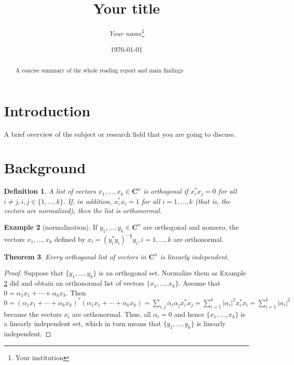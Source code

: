 \documentclass[12pt]{article}
\title{Your title}
\author{\textit{Your name}\footnote{Your institution}}
\date{\today}
\newtheorem{thm}{Theorem}[section]
\newtheorem{defn}[thm]{Definition}
\theoremstyle{definition}
\newtheorem{eg}[thm]{Example}
\begin{document}
\maketitle

\begin{abstract}
A concise summary of the whole reading report and main findings
\end{abstract}

\section{Introduction}

A brief overview of the subject or research field that you are going to discuss.

\section{Background}

\begin{defn}
A list of vectors $x_1,...,x_k\in \mathbf{C}^n$ is \emph{orthogonal} if $x_i^*x_j=0$ for all $i\neq j, i,j\in\{1,...,k\}$. If, in addition, $x_i^*x_i=1$ for all $i=1,...,k$ (that is, the vectors are \emph{normalized}), then the list is \emph{orthonormal}.
\end{defn}

\begin{eg}[normalization]
\label{Normalization}
If $y_1,...,y_k\in \mathbf{C}^n$ are orthogonal and nonzero, the vectors $x_1,...,x_k$ defined by $x_i=(y_i^*y_i)^{-\frac{1}{2}}y_i, i=1,...,k$ are orthonormal.
\end{eg}

\begin{thm}
Every orthogonal list of vectors in $\mathbf{C}^n$ is linearly independent.
\end{thm}
\begin{proof}
Suppose that $\{y_1,...,y_k\}$ is an orthogonal set. Normalize them as Example \ref{Normalization} did and obtain an orthonormal list of vectors $\{x_1,...,x_k\}$. Assume that $0=\alpha_1x_1+\cdots+\alpha_k x_k$. Then $0=(\alpha_1x_1+\cdots+\alpha_k x_k)^*(\alpha_1x_1+\cdots+\alpha_k x_k)=\sum\limits_{i,j} \bar{\alpha}_i \alpha_j x_i^*x_j= \sum\limits_{i=1}^k |\alpha_i|^2 x_i^*x_i=\sum\limits_{i=1}^k |\alpha_i|^2$ because the vectors $x_i$ are orthonormal. Thus, all $\alpha_i=0$ and hence $\{x_1,...,x_k\}$ is a linearly independent set, which in turn means that $\{y_1,...,y_k\}$ is linearly independent.
\end{proof}
\end{document}
